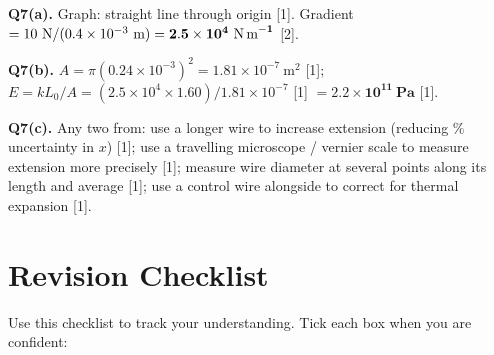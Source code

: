 \begin{markscheme}
\vspace{0.5em}\textbf{Q7(a).} Graph: straight line through origin [1]. Gradient $= 10\ \text{N} / (0.4\times10^{-3}\ \text{m}) = \mathbf{2.5\times10^4\ \text{N\,m}^{-1}}$ [2].

\vspace{0.5em}\textbf{Q7(b).} $A = \pi(0.24\times10^{-3})^2 = 1.81\times10^{-7}\ \text{m}^2$ [1]; $E = kL_0/A = (2.5\times10^4 \times 1.60) / 1.81\times10^{-7}$ [1] $= \mathbf{2.2\times10^{11}\ \text{Pa}}$ [1].

\vspace{0.5em}\textbf{Q7(c).} Any two from: use a longer wire to increase extension (reducing \% uncertainty in $x$) [1]; use a travelling microscope / vernier scale to measure extension more precisely [1]; measure wire diameter at several points along its length and average [1]; use a control wire alongside to correct for thermal expansion [1].

\end{markscheme}

\newpage
\section{Revision Checklist}

Use this checklist to track your understanding. Tick each box when you are confident:

